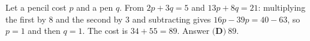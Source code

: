 Let a pencil cost $p$ and a pen $q$. From $2p+3q=5$ and $13p+8q=21$: multiplying the first by $8$ and the second by $3$ and subtracting gives $16p-39p=40-63$, so $p=1$ and then $q=1$. The cost is $34+55=89$. Answer $\boxed{\textbf{(D)}\ 89}$.
